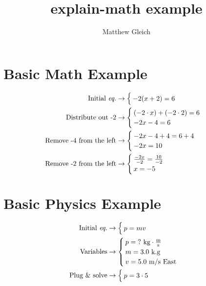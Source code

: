\documentclass{report}
\title{explain-math example}
\author{Matthew Gleich}
\date{}
\begin{document}
    \maketitle

    \section{Basic Math Example}
        \begin{align*}
            \text{Initial \textit{eq.}}&\rightarrow \begin{cases} \displaystyle -2(x + 2) = 6 \end{cases} \\
            \text{Distribute out -2}&\rightarrow \begin{cases} 
                (-2 \cdot x) + (-2 \cdot 2) = 6 \\
                -2x - 4 = 6
             \end{cases} \\
            \text{Remove -4 from the left}&\rightarrow \begin{cases} 
                -2x - 4 + 4 = 6 + 4 \\
                -2x = 10
             \end{cases} \\
            \text{Remove -2 from the left}&\rightarrow \begin{cases} 
                \frac{-2x}{-2} = \frac{10}{-2} \\
                x = -5
             \end{cases} \\
        \end{align*}

    \section{Basic Physics Example}
        \begin{align*}
            \text{Initial \textit{eq.}}&\rightarrow \begin{cases} \displaystyle p = mv \end{cases} \\
            \text{Variables}&\rightarrow \begin{cases} 
                p = \text{?} \text{ kg} \cdot \frac{\text{m}}{\text{s}} \\
                m = 3.0 \text{ k.g} \\
                v = 5.0 \text{ m/s East}
             \end{cases} \\
            \text{Plug \& solve}&\rightarrow \begin{cases} p = 3 \cdot 5 \end{cases} \\
        \end{align*}
\end{document}
